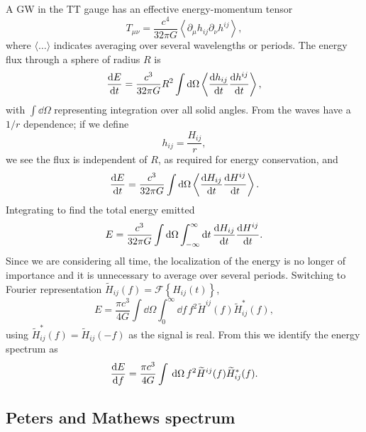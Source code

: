 A GW in the TT gauge has an effective energy-momentum tensor \citep[section 35.15]{Misner1973}
\begin{equation}
T_{\mu\nu} = \dfrac{c^4}{32\pi G}\left\langle\partial_\mu h_{ij} \partial_\nu h^{ij}\right\rangle,
\end{equation}
where $\langle\ldots\rangle$ indicates averaging over several wavelengths or periods. The energy flux through a sphere of radius $R$ is
\begin{equation}
\dfrac{\mathrm{d} {E}}{\mathrm{d} {t}} = \dfrac{c^3}{32\pi G} R^2 \int{\ensuremath{\mathrm{d}}\Omega}\left\langle\dfrac{\mathrm{d} {h_{ij}}}{\mathrm{d} {t}}\dfrac{\mathrm{d} {h^{ij}}}{\mathrm{d} {t}}\right\rangle,
\end{equation}
with $\int{\dd\Omega}$ representing integration over all solid angles. From  the waves have a $1/{r}$ dependence; if we define
\begin{equation}
h_{ij} = \dfrac{H_{ij}}{r},
\end{equation}
we see the flux is independent of $R$, as required for energy conservation, and
\begin{equation}
\dfrac{\mathrm{d} {E}}{\mathrm{d} {t}} = \dfrac{c^3}{32\pi G} \int{\ensuremath{\mathrm{d}}\Omega}\left\langle\dfrac{\mathrm{d} {H_{ij}}}{\mathrm{d} {t}}\dfrac{\mathrm{d} {H^{ij}}}{\mathrm{d} {t}}\right\rangle.
\end{equation}
Integrating to find the total energy emitted
\begin{equation}
E = \dfrac{c^3}{32\pi G} \int{\ensuremath{\mathrm{d}}\Omega}\int_{-\infty}^{\infty}{\mathrm{d} t} \, \dfrac{\mathrm{d} {H_{ij}}}{\mathrm{d} {t}}\dfrac{\mathrm{d} {H^{ij}}}{\mathrm{d} {t}}.
\label{eq:integrate_E}
\end{equation}
Since we are considering all time, the localization of the energy is no longer of importance and it is unnecessary to average over several periods. Switching to Fourier representation $\widetilde{H}_{ij}(f) = \mathscr{F}\left\{H_{ij}(t)\right\}$,
\begin{equation}
E = \dfrac{\pi c^3}{4 G} \int{\dd\Omega}\int_{0}^{\infty}{\dd f} \, f^2 \widetilde{H}^{ij}(f)\widetilde{H}_{ij}^*(f),
\label{eq:total_E}
\end{equation}
using $\widetilde{H}_{ij}^*(f) = \widetilde{H}_{ij}(-f)$ as the signal is real. From this we identify the energy spectrum as
\begin{align}
\dfrac{\mathrm{d} {E}}{\mathrm{d} {f}} = \dfrac{\pi c^3}{4 G} \int_{}^{}{}\,\mathrm{d}{\Omega} \, f^2 \widetilde{H}^{ij}(f)\widetilde{H}_{ij}^*(f).
\label{eq:NK_dEdf}
\end{align}

\subsection{Peters and Mathews spectrum}\label{sec:P-M}

